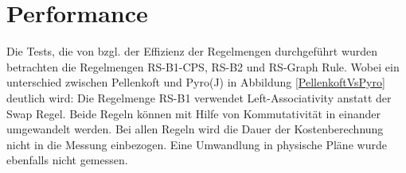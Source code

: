 \section{Performance}






Die Tests, die von \cite{shanbhag2014optimizing} bzgl. der Effizienz der Regelmengen durchgeführt wurden betrachten die Regelmengen RS-B1-CPS, RS-B2 und RS-Graph Rule. Wobei ein unterschied zwischen Pellenkoft und Pyro(J) in Abbildung \ref{PellenkoftVsPyro} deutlich wird: Die Regelmenge RS-B1 verwendet Left-Associativity anstatt der Swap Regel. Beide Regeln können mit Hilfe von Kommutativität in einander umgewandelt werden. 
Bei allen Regeln wird die Dauer der Kostenberechnung nicht in die Messung einbezogen. Eine Umwandlung in physische Pläne wurde ebenfalls nicht gemessen.


